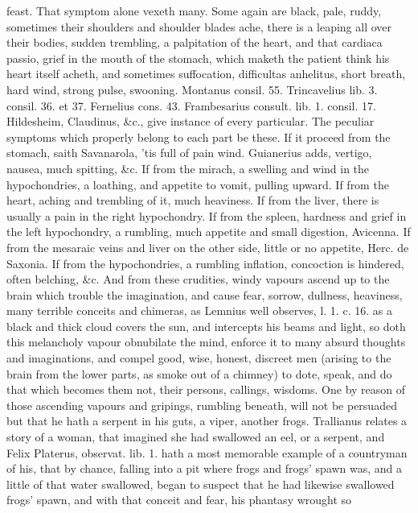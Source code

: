 {feast. That symptom alone vexeth many. Some again are black,
pale, ruddy, sometimes their shoulders and shoulder blades ache, there
is a leaping all over their bodies, sudden trembling, a palpitation of
the heart, and that cardiaca passio, grief in the mouth of the stomach,
which maketh the patient think his heart itself acheth, and sometimes
suffocation, difficultas anhelitus, short breath, hard wind, strong
pulse, swooning. Montanus consil. 55. Trincavelius lib. 3. consil. 36.
et 37. Fernelius cons. 43. Frambesarius consult. lib. 1. consil. 17.
Hildesheim, Claudinus, \&c., give instance of every particular. The
peculiar symptoms which properly belong to each part be these. If it
proceed from the stomach, saith Savanarola, 'tis full of pain
wind. Guianerius adds, vertigo, nausea, much spitting, \&c. If from the
mirach, a swelling and wind in the hypochondries, a loathing, and
appetite to vomit, pulling upward. If from the heart, aching and
trembling of it, much heaviness. If from the liver, there is usually a
pain in the right hypochondry. If from the spleen, hardness and grief
in the left hypochondry, a rumbling, much appetite and small digestion,
Avicenna. If from the mesaraic veins and liver on the other side,
little or no appetite, Herc. de Saxonia. If from the hypochondries, a
rumbling inflation, concoction is hindered, often belching, \&c. And
from these crudities, windy vapours ascend up to the brain which
trouble the imagination, and cause fear, sorrow, dullness, heaviness,
many terrible conceits and chimeras, as Lemnius well observes, l. 1. c.
16. as a black and thick cloud covers the sun, and intercepts his
beams and light, so doth this melancholy vapour obnubilate the mind,
enforce it to many absurd thoughts and imaginations, and compel good,
wise, honest, discreet men (arising to the brain from the  lower
parts, as smoke out of a chimney) to dote, speak, and do that which
becomes them not, their persons, callings, wisdoms. One by reason of
those ascending vapours and gripings, rumbling beneath, will not be
persuaded but that he hath a serpent in his guts, a viper, another
frogs. Trallianus relates a story of a woman, that imagined she had
swallowed an eel, or a serpent, and Felix Platerus, observat. lib. 1.
hath a most memorable example of a countryman of his, that by chance,
falling into a pit where frogs and frogs' spawn was, and a little of
that water swallowed, began to suspect that he had likewise swallowed
frogs' spawn, and with that conceit and fear, his phantasy wrought so
}
